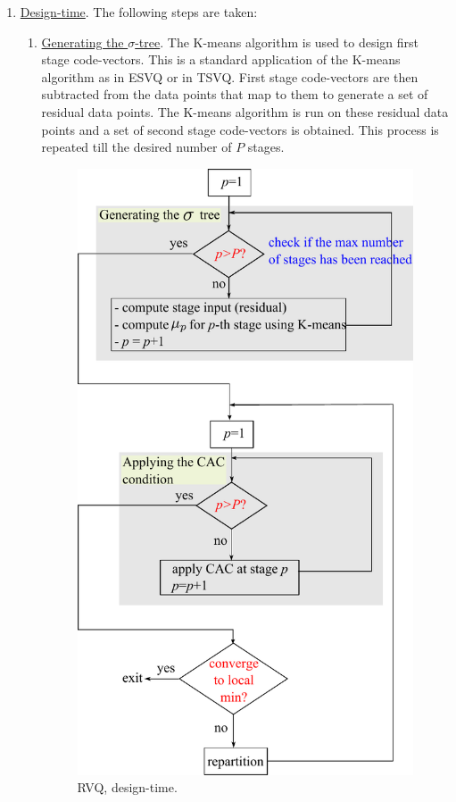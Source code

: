 \begin{enumerate} 
\item \underline{Design-time}.  The following steps are taken:
\begin{enumerate}
\item \underline{Generating the $\sigma$-tree}.  The K-means algorithm is used to design first stage code-vectors.  This is a standard application of the K-means algorithm as in ESVQ or in TSVQ.  First stage code-vectors are then subtracted from the data points that map to them to generate a set of residual data points.  The K-means algorithm is run on these residual data points and a set of second stage code-vectors is obtained.  This process is repeated till the desired number of $P$ stages.

								\begin{figure}[t]
								\centering
								\includegraphics[height=0.6\textheight]{thesis/RVQ_encoder_flowDiagram.pdf}
								\caption{RVQ, design-time.}
								\label{fig:RVQ_design_time}
								\end{figure}



\end{enumerate}
\end{enumerate}
